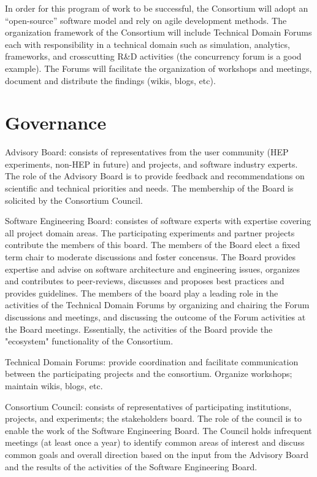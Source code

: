 \documentclass[12pt,letterpaper,fleqn]{article}
\begin{document}
In order for this program of work to be successful, the Consortium
will adopt an “open-source” software model and rely on agile
development methods.  The organization framework of the Consortium
will include Technical Domain Forums each with responsibility in a
technical domain such as simulation, analytics, frameworks, and
crosscutting R\&D activities (the concurrency forum is a good example).
The Forums will facilitate the organization of workshops and meetings,
document and distribute the findings (wikis, blogs, etc).   


\section{Governance}
\label{sec:governance}

Advisory Board: consists of representatives from the user community
(HEP experiments, non-HEP in future) and projects, and software
industry experts.  The role of the Advisory Board is to provide feedback
and recommendations on scientific and technical priorities and needs.  The membership of the
Board is solicited by the Consortium Council.


Software Engineering Board: consistes of software experts with expertise covering
all project domain areas. The participating experiments and partner
projects contribute the members of this board.  The members of the Board elect a fixed term chair to moderate discussions and foster concensus. The Board provides expertise
and advise on software architecture and engineering issues, organizes and contributes to
peer-reviews, discusses and proposes best practices and provides guidelines.
The members of the board play a leading role in the activities of
the Technical Domain Forums by organizing and chairing the Forum discussions and meetings, and  discussing the outcome
of the Forum activities at the Board meetings.  Essentially, the activities of the Board provide the "ecosystem" functionality of the Consortium.  

Technical Domain Forums: provide coordination and facilitate
communication between the participating projects and the consortium.
Organize workshops; maintain wikis, blogs, etc.

Consortium Council: consists of representatives of participating
institutions, projects, and experiments; the stakeholders board.  The role of the council is to enable the work of the Software Engineering Board.  The Council holds infrequent meetings (at least once a year) to 
identify common areas of interest and discuss common goals and overall
direction based on the input from the Advisory Board and the results of the activities of the Software Engineering Board.
\end{document}
